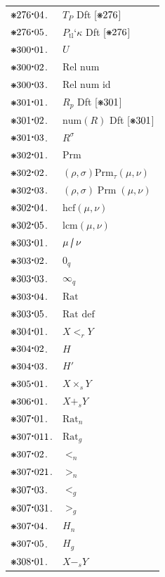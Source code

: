 \documentclass[12pt,openany,leqno,twocolumn]{book}
\newcommand{\pmast}{\text{\resizebox{!}{.75\height}{\ding{107}}}} %
\newcommand{\pmcdot}{\text{\raisebox{.05cm}{$\boldsymbol\cdot$}}} %
\newcommand{\pmcsercls}[2]{{#1}_{#2}} %
\newcommand{\pmCsercls}[2]{{#1}_{\text{tl}}\textbf{`}{#2}} %
\newcommand{\pmu}{\textit{U}} %
\newcommand{\pmrnum}{\text{Rel num}} %
\newcommand{\pmrnumid}{\text{Rel num id}} %
\newcommand{\pmrpwr}[2]{#1^#2} %
\newcommand{\pmPrm}{\text{Prm}} %
\newcommand{\pmrprm}[4]{(#1,#2)\mathbin{\pmPrm_\tau}(#3,#4)} %
\newcommand{\pmprm}[4]{(#1,#2)\mathbin{\pmPrm}(#3,#4)} %
\newcommand{\pmhcf}[2]{\text{hcf}(#1,#2)} %
\newcommand{\pmlcm}[2]{\text{lcm}(#1,#2)} %
\newcommand{\pmrat}[2]{#1 \rotatebox[origin=c]{10}{$\boldsymbol{/}$} #2} %
\newcommand{\pmqn}[1]{#1_q} %
\newcommand{\pmqnil}{\infty_q} %
\newcommand{\pmRat}{\text{Rat}} %
\newcommand{\pmRatdef}{\text{Rat def}} %
\newcommand{\pmqnle}[2]{#1 \mathrel{\boldsymbol{<}_r} #2} %
\newcommand{\pmqnLe}{H} %
\newcommand{\pmqnlez}{H'} %
\newcommand{\pmprodsr}[2]{#1 \times_s #2} %
\newcommand{\pmsumsr}[2]{#1 +_s #2} %
\newcommand{\pmratn}{\text{Rat}_n} %
\newcommand{\pmratg}{\text{Rat}_g} %
\newcommand{\pmRatnle}{\boldsymbol{<}_n}
\newcommand{\pmRatngr}{\boldsymbol{>}_n}
\newcommand{\pmRatgle}{\boldsymbol{<}_g}
\newcommand{\pmRatggr}{\boldsymbol{>}_g}
\newcommand{\pmratnLe}{H_n} %
\newcommand{\pmratgLe}{H_g} %
\newcommand{\pmratssub}[2]{#1 \boldsymbol{-}_s #2} %
\begin{document}
\begin{tabular}{l l}
$\pmast276\pmcdot04$. & $\pmcsercls{T}{P}$ \hspace{8.2ex} Dft [\(\pmast276\)] \\
$\pmast276\pmcdot05$. & $\pmCsercls{P}{\kappa}$ \hspace{6.25ex} Dft [\(\pmast276\)] \\
$\pmast300\pmcdot01$. & $\pmu$ \\
$\pmast300\pmcdot02$. & $\pmrnum$ \\
$\pmast300\pmcdot03$. & $\pmrnumid$ \\
$\pmast301\pmcdot01$. & $R_p$ \hspace{8.2ex} Dft [\(\pmast301\)] \\
$\pmast301\pmcdot02$. & $\text{num}(R)$ \hspace{3ex} Dft [\(\pmast301\)] \\
$\pmast301\pmcdot03$. & $\pmrpwr{R}{\sigma}$ \\
$\pmast302\pmcdot01$. & $\pmPrm$ \\
$\pmast302\pmcdot02$. & $\pmrprm{\rho}{\sigma}{\mu}{\nu}$ \\
$\pmast302\pmcdot03$. & $\pmprm{\rho}{\sigma}{\mu}{\nu}$ \\
$\pmast302\pmcdot04$. & $\pmhcf{\mu}{\nu}$ \\
$\pmast302\pmcdot05$. & $\pmlcm{\mu}{\nu}$ \\
$\pmast303\pmcdot01$. & $\pmrat{\mu}{\nu}$ \\
$\pmast303\pmcdot02$. & $\pmqn{0}$ \\
$\pmast303\pmcdot03$. & $\pmqnil$ \\
$\pmast303\pmcdot04$. & $\pmRat$ \\
$\pmast303\pmcdot05$. & $\pmRatdef$ \\
$\pmast304\pmcdot01$. & $\pmqnle{X}{Y}$ \\
$\pmast304\pmcdot02$. & $\pmqnLe$ \\
$\pmast304\pmcdot03$. & $\pmqnlez$ \\
$\pmast305\pmcdot01$. & $\pmprodsr{X}{Y}$ \\
$\pmast306\pmcdot01$. & $\pmsumsr{X}{Y}$ \\
$\pmast307\pmcdot01$. & $\pmratn$ \\
$\pmast307\pmcdot011$. & $\pmratg$ \\
$\pmast307\pmcdot02$. & $\pmRatnle$ \\
$\pmast307\pmcdot021$. & $\pmRatngr$ \\
$\pmast307\pmcdot03$. & $\pmRatgle$ \\
$\pmast307\pmcdot031$. & $\pmRatggr$ \\
$\pmast307\pmcdot04$. & $\pmratnLe$ \\
$\pmast307\pmcdot05$. & $\pmratgLe$ \\
$\pmast308\pmcdot01$. & $\pmratssub{X}{Y}$ 
\end{tabular}
\end{document}
